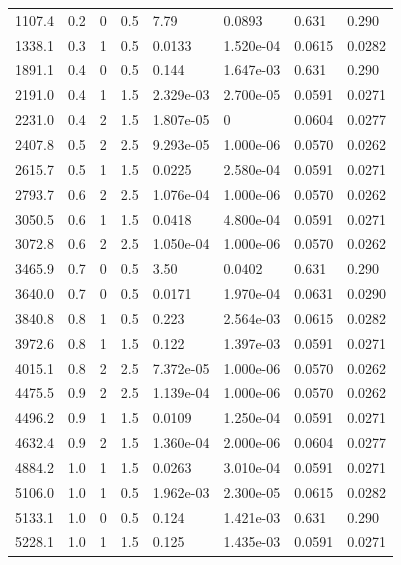 \documentclass[preview]{standalone}
\begin{document}
{{\begin{tabular}{L{1.2cm}C{1.2cm} C{0.3cm}C{0.5cm} C{1.4cm}C{1.4cm} C{1.4cm}C{1.4cm}}
  1107.4  &   0.2  & 0     & 0.5 &  7.79  & 0.0893  & 0.631 &  0.290   \\ 
  1338.1  &   0.3  & 1     & 0.5 &  0.0133  & 1.520e-04  & 0.0615 &  0.0282   \\ 
  1891.1  &   0.4  & 0     & 0.5 &  0.144  & 1.647e-03  & 0.631 &  0.290   \\ 
  2191.0  &   0.4  & 1     & 1.5 &  2.329e-03  & 2.700e-05  & 0.0591 &  0.0271   \\ 
  2231.0  &   0.4  & 2     & 1.5 &  1.807e-05  & 0  & 0.0604 &  0.0277   \\ 
  2407.8  &   0.5  & 2     & 2.5 &  9.293e-05  & 1.000e-06  & 0.0570 &  0.0262   \\ 
  2615.7  &   0.5  & 1     & 1.5 &  0.0225  & 2.580e-04  & 0.0591 &  0.0271   \\ 
  2793.7  &   0.6  & 2     & 2.5 &  1.076e-04  & 1.000e-06  & 0.0570 &  0.0262   \\ 
  3050.5  &   0.6  & 1     & 1.5 &  0.0418  & 4.800e-04  & 0.0591 &  0.0271   \\ 
  3072.8  &   0.6  & 2     & 2.5 &  1.050e-04  & 1.000e-06  & 0.0570 &  0.0262   \\ 
  3465.9  &   0.7  & 0     & 0.5 &  3.50  & 0.0402  & 0.631 &  0.290   \\ 
  3640.0  &   0.7  & 0     & 0.5 &  0.0171  & 1.970e-04  & 0.0631 &  0.0290   \\ 
  3840.8  &   0.8  & 1     & 0.5 &  0.223  & 2.564e-03  & 0.0615 &  0.0282   \\ 
  3972.6  &   0.8  & 1     & 1.5 &  0.122  & 1.397e-03  & 0.0591 &  0.0271   \\ 
  4015.1  &   0.8  & 2     & 2.5 &  7.372e-05  & 1.000e-06  & 0.0570 &  0.0262   \\ 
  4475.5  &   0.9  & 2     & 2.5 &  1.139e-04  & 1.000e-06  & 0.0570 &  0.0262   \\ 
  4496.2  &   0.9  & 1     & 1.5 &  0.0109  & 1.250e-04  & 0.0591 &  0.0271   \\ 
  4632.4  &   0.9  & 2     & 1.5 &  1.360e-04  & 2.000e-06  & 0.0604 &  0.0277   \\ 
  4884.2  &   1.0  & 1     & 1.5 &  0.0263  & 3.010e-04  & 0.0591 &  0.0271   \\ 
  5106.0  &   1.0  & 1     & 0.5 &  1.962e-03  & 2.300e-05  & 0.0615 &  0.0282   \\ 
  5133.1  &   1.0  & 0     & 0.5 &  0.124  & 1.421e-03  & 0.631 &  0.290   \\ 
  5228.1  &   1.0  & 1     & 1.5 &  0.125  & 1.435e-03  & 0.0591 &  0.0271   \\ 

\end{tabular}}}
\end{document}
